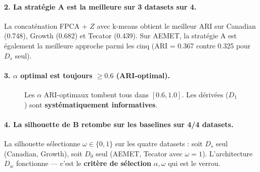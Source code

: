\documentclass[11pt, a4paper]{article}
\newcommand{\Dw}{D_w}
\begin{document}
\paragraph{2. La stratégie A est la meilleure sur 3 datasets sur 4.}
La concaténation FPCA + $Z$ avec k-means obtient le meilleur ARI sur
Canadian (0.748), Growth (0.682) et Tecator (0.439). Sur AEMET, la stratégie
A est également la meilleure approche parmi les cinq (ARI = 0.367 contre
0.325 pour $D_s$ seul).

\paragraph{3. $\alpha$ optimal est toujours $\geq 0.6$ (ARI-optimal).}

\begin{figure}[H]
\centering
{}
\caption{Les $\alpha$ ARI-optimaux tombent tous dans $[0.6, 1.0]$.
Les dérivées ($D_1$) sont \textbf{systématiquement informatives}.}
\end{figure}

\paragraph{4. La silhouette de B retombe sur les baselines sur 4/4 datasets.}
La silhouette sélectionne $\omega \in \{0, 1\}$ sur les quatre datasets :
soit $D_s$ seul (Canadian, Growth), soit $D_0$ seul (AEMET, Tecator avec
$\omega = 1$). L'architecture $\Dw$ fonctionne — c'est le \textbf{critère de
sélection} $\alpha, \omega$ qui est le verrou.

\newpage
\end{document}

